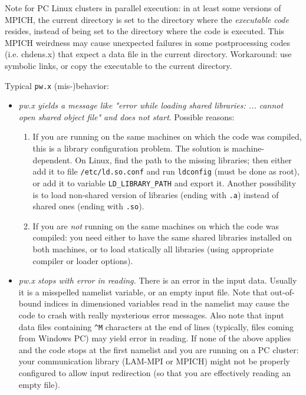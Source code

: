 \documentclass[12pt]{article}
\begin{document}
Note for PC Linux clusters in parallel execution: in at least some 
versions of MPICH, the current directory is set to the directory
where the {\em executable code} resides, instead of being set to
the directory where the code is executed. This MPICH weirdness may 
cause unexpected failures in some postprocessing codes (i.e. chdens.x) 
that expect a data file in the current directory. Workaround: use 
symbolic links, or copy the executable to the current directory.

Typical {\tt pw.x} (mis-)behavior:
\begin{itemize}
\item {\em pw.x yields a message like "error while loading shared 
      libraries: ... cannot open shared object file" and does not start}.
      Possible reasons: 
      \begin{enumerate}
      \item
      If you are running on the same machines on which the code was compiled,
      this is a library configuration problem. The solution is 
      machine-dependent. On Linux, find the path to the missing libraries;
      then either add it to file {\tt /etc/ld.so.conf} and run {\tt ldconfig}
      (must be done as root), or add it to variable {\tt LD\_LIBRARY\_PATH} and
      export it. Another possibility is to load non-shared version of libraries
      (ending with {\tt .a}) instead of shared ones (ending with {\tt .so}).
      \item
      If you are {\em not} running on the same machines on which the code was 
      compiled: you need either to have the same shared libraries installed on
      both machines, or to load statically all libraries (using appropriate 
      compiler or loader options).
      \end{enumerate}
\item {\em pw.x stops with error in reading.} There is an error
      in the input data. Usually it is a misspelled namelist variable,
      or an empty input file.
      Note that out-of-bound indices in dimensioned variables read in the
      namelist may cause the code to crash with really mysterious error
      messages.
      Also note that input data files containing {\tt \^{}M} characters
      at the end of lines (typically, files coming from Windows PC)
      may yield error in reading.
      If none of the above applies and the code stops at the first
      namelist and you are running on a PC cluster: your communication
      library (LAM-MPI or MPICH) might not be properly configured to allow
      input redirection (so that you are effectively reading an empty file).

\end{itemize}
\end{document}
